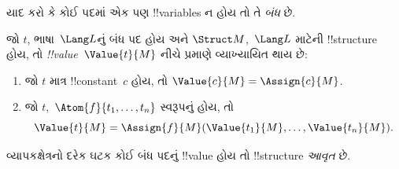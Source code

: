 \documentclass[../../../include/open-logic-section]{subfiles}
\begin{document}


\begin{explain}
યાદ કરો કે કોઈ પદમાં એક પણ !!{variable}s ન હોય તો તે \emph{બંધ} છે.
\end{explain}

\begin{defn}[બંધ પદોનું !!^{value}]
જો $t$, ભાષા~$\Lang L$નું બંધ પદ હોય અને $\Struct M$,~$\Lang L$
માટેની !!{structure} હોય, તો \emph{!!{value}}~$\Value{t}{M}$ નીચે
પ્રમાણે વ્યાખ્યાયિત થાય છે:
\begin{enumerate}
\item જો $t$ માત્ર !!{constant}~$c$ હોય, તો $\Value{c}{M} = \Assign{c}{M}$.
\item જો $t$,~$\Atom{f}{t_1, \ldots, t_n}$ સ્વરૂપનું હોય, તો
  \[
  \Value{t}{M} = \Assign{f}{M}(\Value{t_1}{M}, \ldots,
  \Value{t_n}{M}).
  \]
\end{enumerate}
\end{defn}

\begin{defn}[આવૃત !!{structure}]
વ્યાપકક્ષેત્રનો દરેક ઘટક કોઈ બંધ પદનું !!{value} હોય તો !!{structure}
\emph{આવૃત} છે.
\end{defn}
\end{document}
